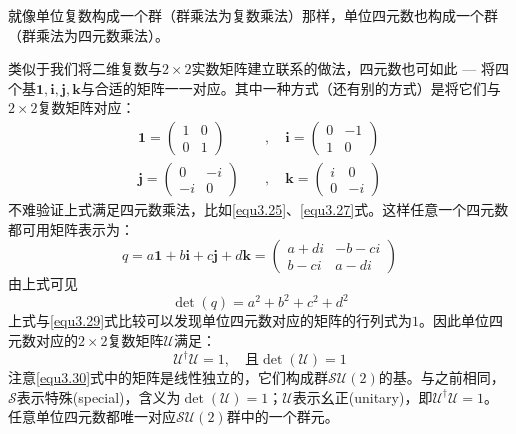 就像单位复数构成一个群（群乘法为复数乘法）那样，单位四元数也构成一个群（群乘法为四元数乘法）。

类似于我们将二维复数与$2 \times 2$实数矩阵建立联系的做法，四元数也可如此 --- 将四个基$\mathbf{1,i,j,k}$与合适的矩阵一一对应。其中一种方式（还有别的方式）是将它们与$2 \times 2$复数矩阵对应：
\begin{align}
\mathbf{1} = \begin{pmatrix}
				1 & 0 \\ 0 & 1
			 \end{pmatrix}
\quad &, \quad
\mathbf{i} = \begin{pmatrix}
				0 & -1 \\ 1 & 0
			 \end{pmatrix}
\nonumber \\
\label{equ3.30}
\mathbf{j} = \begin{pmatrix}
				0 & -i \\ -i & 0
			 \end{pmatrix}
\quad &, \quad
\mathbf{k} = \begin{pmatrix}
				i & 0 \\
				0 & -i
			 \end{pmatrix}
\end{align}
不难验证上式满足四元数乘法，比如\ref{equ3.25}、\ref{equ3.27}式。这样任意一个四元数都可用矩阵表示为：
\begin{equation}
\label{equ3.31}
q = a\mathbf{1} + b\mathbf{i} + c\mathbf{j} + d\mathbf{k} = \begin{pmatrix}
	a + di & -b - ci \\
	b - ci & a - di
	\end{pmatrix}
\end{equation}
由上式可见
\begin{equation}
\label{equ3.32}
\det(q) = a^2 + b^2 + c^2 + d^2
\end{equation}
上式与\ref{equ3.29}式比较可以发现单位四元数对应的矩阵的行列式为$1$。因此单位四元数对应的$2 \times 2$复数矩阵$\mathcal{U}$满足：
\begin{equation}
\label{equ3.33}
\mathcal{U}^\dag \mathcal{U} = 1, \quad \text{且} \det(\mathcal{U}) = 1
\end{equation}
注意\ref{equ3.30}式中的矩阵是线性独立的，它们构成群$\mathcal{SU}(2)$的基。与之前相同，$\mathcal{S}$表示特殊(special)，含义为$\det (\mathcal{U}) = 1$；$\mathcal{U}$表示幺正(unitary)，即$\mathcal{U}^\dag \mathcal{U} = 1$。任意单位四元数都唯一对应$\mathcal{SU}(2)$群中的一个群元。

